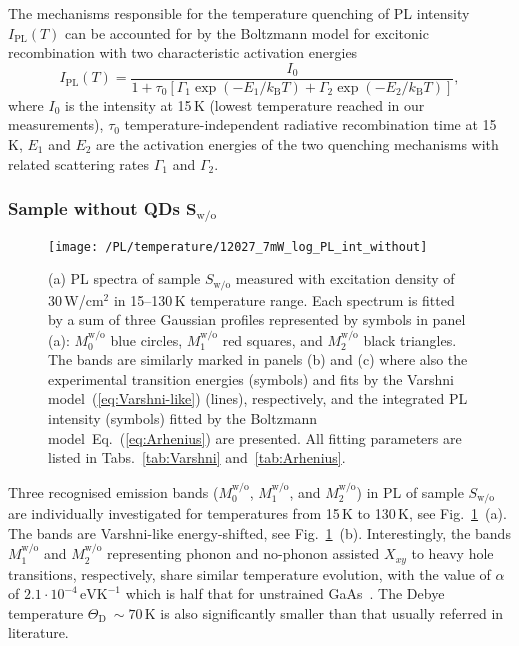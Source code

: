 The mechanisms responsible for the temperature quenching of PL intensity $I_\mathrm{PL}(T)$ can be accounted for by the Boltzmann model for excitonic recombination with two characteristic activation energies~\citep{Daly_prb1995, Alen_apl2011}
\begin{equation}
I_\mathrm{PL}(T)=\frac{I_0}{1+\tau_0\left[\Gamma_1\exp(-E_1/k_\mathrm{B}T)+\Gamma_2\exp(-E_2/k_\mathrm{B}T)\right]},               \label{eq:Arhenius}
\end{equation}
where $I_0$ is the intensity at 15$\,$K (lowest temperature reached in our measurements), $\tau_0$ temperature-independent radiative recombination time at 15$\,$K, $E_1$ and $E_2$ are the activation energies of the two quenching mechanisms with related scattering rates $\Gamma_1$ and $\Gamma_2$.%

\subsubsection*{Sample without QDs $\mathbf{S_\mathrm{w/o}}$}
%
\begin{figure}
	\centering
	\texttt{[image: /PL/temperature/12027\_7mW\_log\_PL\_int\_without]}
	\caption{(a) PL spectra of sample $S_\mathrm{w/o}$ measured with excitation density of 30$\,$W/cm$^2$ in 15--130$\,$K temperature range. Each spectrum is fitted by a sum of three Gaussian profiles represented by symbols in panel (a): $M_0^\mathrm{w/o}$ blue circles, $M_1^\mathrm{w/o}$ red squares, and $M_2^\mathrm{w/o}$ black triangles. The bands are similarly marked in panels (b) and (c) where also the experimental transition energies (symbols) and fits by the Varshni model~(\ref{eq:Varshni-like}) (lines), respectively, and the integrated PL intensity (symbols) fitted by the Boltzmann model~Eq.~(\ref{eq:Arhenius}) are presented. All fitting parameters are listed in Tabs.~\ref{tab:Varshni} and~\ref{tab:Arhenius}.}
	\label{fig:QD_wo_temp}
\end{figure}

Three recognised emission bands ($M_0^\mathrm{w/o}$, $M_1^\mathrm{w/o}$, and $M_2^\mathrm{w/o}$) in PL of sample ${S_\mathrm{w/o}}$ are individually investigated for temperatures from 15$\,$K to 130$\,$K, see Fig.~\ref{fig:QD_wo_temp}~(a). The bands are  Varshni-like energy-shifted,
see Fig.~\ref{fig:QD_wo_temp}~(b). Interestingly, the bands $M_1^\mathrm{w/o}$ and $M_2^\mathrm{w/o}$ representing phonon and no-phonon assisted $X_{xy}$ to heavy hole transitions, respectively, share similar temperature evolution, with the value of $\alpha$ of $2.1\cdot10^{-4}\,\mathrm{eVK^{-1}}$ which is half that for unstrained GaAs~\cite{ioffe, Vurgaftman}. The Debye temperature $\Theta_\mathrm{D}~\sim70$$\,$K is also significantly smaller than that usually referred in literature.

